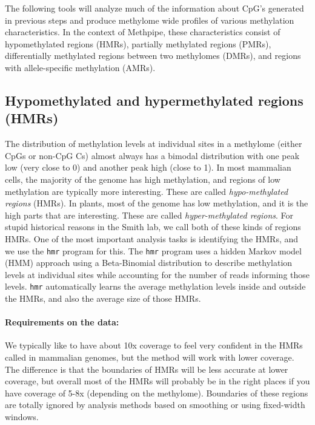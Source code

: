 \documentclass[10pt]{article}
\newcommand{\prog}[1]{\texttt{#1}}
\begin{document}
The following tools will analyze much of the information about CpG's
generated in previous steps and produce methylome wide profiles of
various methylation characteristics. In the context of Methpipe, these
characteristics consist of hypomethylated regions (HMRs), partially
methylated regions (PMRs), differentially methylated regions between
two methylomes (DMRs), and regions with allele-specific methylation
(AMRs).

\subsection{Hypomethylated and hypermethylated regions (HMRs)}
\label{sec:indent-hypo-methyl}

The distribution of methylation levels at individual sites in a
methylome (either CpGs or non-CpG Cs) almost always has a bimodal
distribution with one peak low (very close to 0) and another peak high
(close to 1). In most mammalian cells, the majority of the genome has
high methylation, and regions of low methylation are typically more
interesting. These are called {\em hypo-methylated regions} (HMRs). In
plants, most of the genome has low methylation, and it is the high
parts that are interesting. These are called {\em hyper-methylated
  regions}. For stupid historical reasons in the Smith lab, we call
both of these kinds of regions HMRs. One of the most important
analysis tasks is identifying the HMRs, and we use the \prog{hmr}
program for this. The \prog{hmr} program uses a hidden Markov model
(HMM) approach using a Beta-Binomial distribution to describe
methylation levels at individual sites while accounting for the number
of reads informing those levels. \prog{hmr} automatically learns the
average methylation levels inside and outside the HMRs, and also the
average size of those HMRs.

\paragraph{Requirements on the data:}
We typically like to have about 10x coverage to feel very confident in
the HMRs called in mammalian genomes, but the method will work with
lower coverage. The difference is that the boundaries of HMRs will be
less accurate at lower coverage, but overall most of the HMRs will
probably be in the right places if you have coverage of 5-8x
(depending on the methylome). Boundaries of these regions are totally
ignored by analysis methods based on smoothing or using fixed-width
windows.
\end{document}
